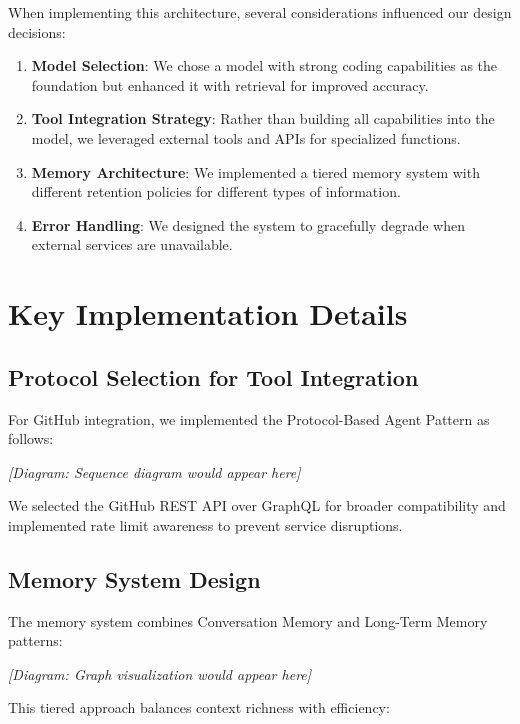\documentclass[11pt,oneside]{book}
\begin{document}
When implementing this architecture, several considerations influenced
our design decisions:

\begin{enumerate}
\def\labelenumi{\arabic{enumi}.}
\item
  \textbf{Model Selection}: We chose a model with strong coding
  capabilities as the foundation but enhanced it with retrieval for
  improved accuracy.
\item
  \textbf{Tool Integration Strategy}: Rather than building all
  capabilities into the model, we leveraged external tools and APIs for
  specialized functions.
\item
  \textbf{Memory Architecture}: We implemented a tiered memory system
  with different retention policies for different types of information.
\item
  \textbf{Error Handling}: We designed the system to gracefully degrade
  when external services are unavailable.
\end{enumerate}

\section{Key Implementation Details}\label{key-implementation-details}

\subsection{Protocol Selection for Tool
Integration}\label{protocol-selection-for-tool-integration}

For GitHub integration, we implemented the Protocol-Based Agent Pattern
as follows:

\emph{{[}Diagram: Sequence diagram would appear here{]}}

We selected the GitHub REST API over GraphQL for broader compatibility
and implemented rate limit awareness to prevent service disruptions.

\subsection{Memory System Design}\label{memory-system-design}

The memory system combines Conversation Memory and Long-Term Memory
patterns:

\emph{{[}Diagram: Graph visualization would appear here{]}}

This tiered approach balances context richness with efficiency:
\end{document}
